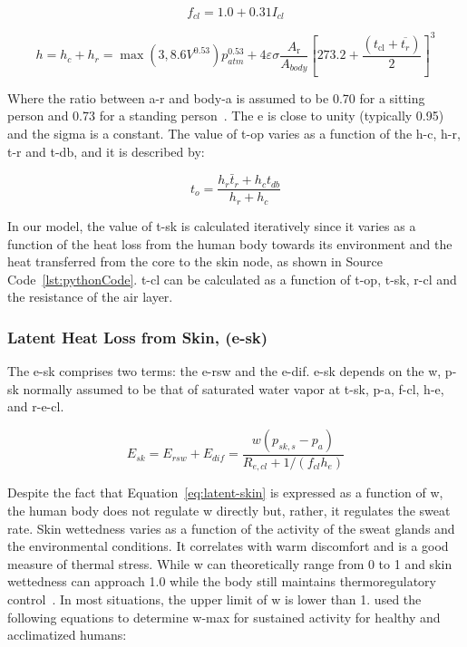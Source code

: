 \begin{equation}
    f_{cl}=1.0 + 0.31 I_{cl} \label{eq:f-cl}
\end{equation}

\begin{equation}
    h=h_{c} + h_{r} = \max(3, 8.6 V^{0.53}) p_{atm}^{0.53} + 4 \varepsilon \sigma \frac{A_{\mathrm{r}}}{A_{body}}\left[273.2+\frac{\left(t_{\mathrm{cl}}+\overline{t_{r}}\right)}{2}\right]^{3}\label{eq:h}
\end{equation}

Where the ratio between \ac{a-r} and \ac{body-a} is assumed to be 0.70 for a sitting person and 0.73 for a standing person~\cite{Fanger1967}.
The \ac{e} is close to unity (typically 0.95) and the \ac{sigma} is a constant.
The value of \ac{t-op} varies as a function of the \ac{h-c}, \ac{h-r}, \ac{t-r} and \ac{t-db}, and it is described by:

\begin{equation}
    t_{o}=\frac{h_{r} \bar{t}_{r}+h_{c} t_{db}}{h_{r}+h_{c}}\label{eq:t-op}
\end{equation}

In our model, the value of \ac{t-sk} is calculated iteratively since it varies as a function of the heat loss from the human body towards its environment and the heat transferred from the core to the skin node, as shown in Source Code~\ref{lst:pythonCode}.
\Ac{t-cl} can be calculated as a function of \ac{t-op}, \ac{t-sk}, \ac{r-cl} and the resistance of the air layer.

\subsubsection{Latent Heat Loss from Skin, (\acs{e-sk})}

The \acf{e-sk} comprises two terms: the \ac{e-rsw} and the \ac{e-dif}.
\ac{e-sk} depends on the \ac{w}, \ac{p-sk} normally assumed to be that of saturated water vapor at \ac{t-sk}, \ac{p-a}, \ac{f-cl}, \ac{h-e}, and \ac{r-e-cl}.

\begin{equation}
    E_{s k}=E_{rsw}+E_{dif}=\frac{w\left(p_{s k, s}-p_{a}\right)}{R_{e, c l}+1 /\left(f_{c l} h_{e}\right)}\label{eq:latent-skin}
\end{equation}

Despite the fact that Equation~\ref{eq:latent-skin} is expressed as a function of \ac{w}, the human body does not regulate \ac{w} directly but, rather, it regulates the sweat rate.
Skin wettedness varies as a function of the activity of the sweat glands and the environmental conditions.
It correlates with warm discomfort and is a good measure of thermal stress.
While \ac{w} can theoretically range from 0 to 1 and skin wettedness can approach 1.0 while the body still maintains thermoregulatory control~\cite{ASHRA2017}.
In most situations, the upper limit of \ac{w} is lower than 1.
 used the following equations to determine \ac{w-max} for sustained activity for healthy and acclimatized humans:

